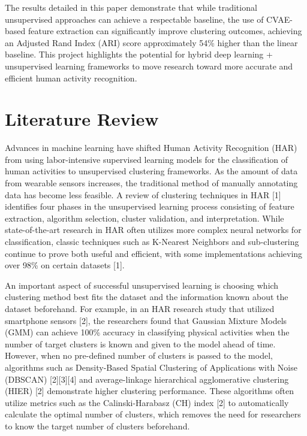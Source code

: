\documentclass[12pt]{IEEEtran}
\begin{document}
The results detailed in this paper demonstrate that while traditional unsupervised approaches can achieve a respectable baseline, the use of CVAE-based feature extraction can significantly improve clustering outcomes, achieving an Adjusted Rand Index (ARI) score approximately 54\% higher than the linear baseline. This project highlights the potential for hybrid deep learning + unsupervised learning frameworks to move research toward more accurate and efficient human activity recognition.

\section{Literature Review}
\label{sec:lit}
Advances in machine learning have shifted Human Activity Recognition (HAR) from using labor-intensive supervised learning models for the classification of human activities to unsupervised clustering frameworks. As the amount of data from wearable sensors increases, the traditional method of manually annotating data has become less feasible. A review of clustering techniques in HAR [1] identifies four phases in the unsupervised learning process consisting of feature extraction, algorithm selection, cluster validation, and interpretation. While state-of-the-art research in HAR often utilizes more complex neural networks for classification, classic techniques such as K-Nearest Neighbors and sub-clustering continue to prove both useful and efficient, with some implementations achieving over 98\% on certain datasets [1].

An important aspect of successful unsupervised learning is choosing which clustering method best fits the dataset and the information known about the dataset beforehand. For example, in an HAR research study that utilized smartphone sensors [2], the researchers found that Gaussian Mixture Models (GMM) can achieve 100\% accuracy in classifying physical activities when the number of target clusters is known and given to the model ahead of time. However, when no pre-defined number of clusters is passed to the model, algorithms such as Density-Based Spatial Clustering of Applications with Noise (DBSCAN) [2][3][4] and average-linkage hierarchical agglomerative clustering (HIER) [2] demonstrate higher clustering performance. These algorithms often utilize metrics such as the Calinski-Harabasz (CH) index [2] to automatically calculate the optimal number of clusters, which removes the need for researchers to know the target number of clusters beforehand.
\end{document}
